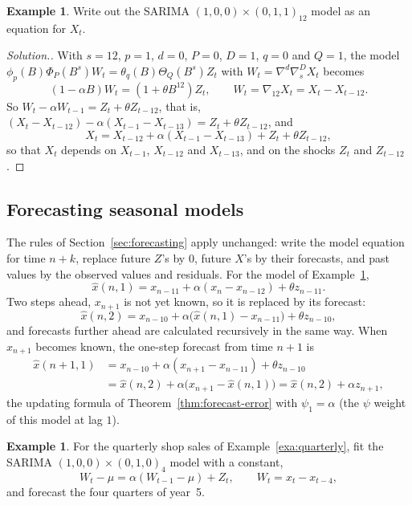 \documentclass[11pt,a4paper]{article}
\theoremstyle{definition}
\newtheorem{exa}[thm]{Example}
\newenvironment{solution}
  {\renewcommand{\qedsymbol}{}\begin{proof}[\textit{Solution}.]}
  {\end{proof}}
\begin{document}
\begin{exa}\label{exa:sarima-expand}
Write out the SARIMA $(1, 0, 0) \times (0, 1, 1)_{12}$ model as an equation for $X_t$.
\end{exa}

\begin{solution}
With $s = 12$, $p = 1$, $d = 0$, $P = 0$, $D = 1$, $q = 0$ and $Q = 1$, the model $\phi_p(B)\Phi_P(B^s)W_t = \theta_q(B)\Theta_Q(B^s)Z_t$ with $W_t = \nabla^d\nabla_s^DX_t$ becomes
\[
(1 - \alpha B)W_t = (1 + \theta B^{12})Z_t , \qquad W_t = \nabla_{12}X_t = X_t - X_{t-12} .
\]
So $W_t - \alpha W_{t-1} = Z_t + \theta Z_{t-12}$, that is, $(X_t - X_{t-12}) - \alpha(X_{t-1} - X_{t-13}) = Z_t + \theta Z_{t-12}$, and
\[
X_t = X_{t-12} + \alpha(X_{t-1} - X_{t-13}) + Z_t + \theta Z_{t-12} ,
\]
so that $X_t$ depends on $X_{t-1}$, $X_{t-12}$ and $X_{t-13}$, and on the shocks $Z_t$ and $Z_{t-12}$.
\end{solution}

\subsection{Forecasting seasonal models}
The rules of Section~\ref{sec:forecasting} apply unchanged: write the model equation for time $n + k$, replace future $Z$'s by $0$,
future $X$'s by their forecasts, and past values by the observed values and residuals. For the model of
Example~\ref{exa:sarima-expand},
\[
\hat x(n, 1) = x_{n-11} + \alpha(x_n - x_{n-12}) + \theta z_{n-11} .
\]
Two steps ahead, $x_{n+1}$ is not yet known, so it is replaced by its forecast:
\[
\hat x(n, 2) = x_{n-10} + \alpha\bigl(\hat x(n, 1) - x_{n-11}\bigr) + \theta z_{n-10} ,
\]
and forecasts further ahead are calculated recursively in the same way. When $x_{n+1}$ becomes known, the one-step
forecast from time $n + 1$ is
\begin{align*}
\hat x(n + 1, 1) &= x_{n-10} + \alpha(x_{n+1} - x_{n-11}) + \theta z_{n-10} \\
&= \hat x(n, 2) + \alpha\bigl(x_{n+1} - \hat x(n, 1)\bigr) = \hat x(n, 2) + \alpha z_{n+1} ,
\end{align*}
the updating formula of Theorem~\ref{thm:forecast-error} with $\psi_1 = \alpha$ (the $\psi$ weight of this model at lag $1$).

\begin{exa}\label{exa:sarima-forecast}
For the quarterly shop sales of Example~\ref{exa:quarterly}, fit the SARIMA $(1, 0, 0) \times (0, 1, 0)_4$ model with a constant,
\[
W_t - \mu = \alpha(W_{t-1} - \mu) + Z_t , \qquad W_t = x_t - x_{t-4} ,
\]
and forecast the four quarters of year~5.
\end{exa}
\end{document}
